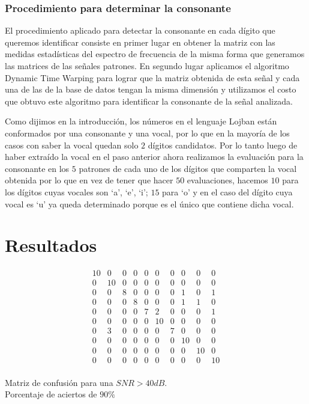 \documentclass[conference,a4paper,10pt,oneside,final]{tfmpd}
\begin{document}
	\subsubsection{Procedimiento para determinar la consonante}

		El procedimiento aplicado para detectar la consonante en cada dígito que
		queremos identificar consiste en primer lugar en obtener la matriz con
		las medidas estadísticas del espectro de frecuencia de la misma forma
		que generamos las matrices de las señales patrones. En segundo lugar
		aplicamos el algoritmo Dynamic Time Warping  para lograr que la matriz
		obtenida de esta señal y cada una de las de la base de datos tengan la
		misma dimensión  y utilizamos el costo que obtuvo este algoritmo para
		identificar la consonante de la señal analizada.

		Como dijimos en la introducción, los números en el lenguaje Lojban
		están conformados por una consonante y una vocal, por lo que en
		la mayoría de los casos con saber la vocal quedan solo $2$ dígitos
		candidatos. Por lo tanto luego de haber extraído la vocal en el paso
		anterior ahora realizamos la evaluación para la consonante en los $5$
		patrones de cada uno de los dígitos que comparten la vocal obtenida por
		lo que en vez de tener que hacer $50$ evaluaciones, hacemos $10$ para los
		dígitos cuyas vocales son `a', `e', `i'; $15$ para `o' y en el caso del dígito
		cuya vocal es `u' ya queda determinado porque es el único que contiene
		dicha vocal.


\section{Resultados}
	\begin{table}
	\[
		\begin{array}{cccccccccc}
10 & 0 & 0 & 0 & 0 & 0 & 0 & 0 & 0 & 0 \\
0 & 10 & 0 & 0 & 0 & 0 & 0 & 0 & 0 & 0 \\
0 & 0 & 8 & 0 & 0 & 0 & 0 & 1 & 0 & 1 \\
0 & 0 & 0 & 8 & 0 & 0 & 0 & 1 & 1 & 0 \\
0 & 0 & 0 & 0 & 7 & 2 & 0 & 0 & 0 & 1 \\
0 & 0 & 0 & 0 & 0 & 10 & 0 & 0 & 0 & 0 \\
0 & 3 & 0 & 0 & 0 & 0 & 7 & 0 & 0 & 0 \\
0 & 0 & 0 & 0 & 0 & 0 & 0 & 10 & 0 & 0 \\
0 & 0 & 0 & 0 & 0 & 0 & 0 & 0 & 10 & 0 \\
0 & 0 & 0 & 0 & 0 & 0 & 0 & 0 & 0 & 10 \\
		\end{array}
	\]
		\caption{Matriz de confusión para una $SNR > 40dB$.\\
		Porcentaje de aciertos de $90\%$}
	\end{table}
\end{document}

